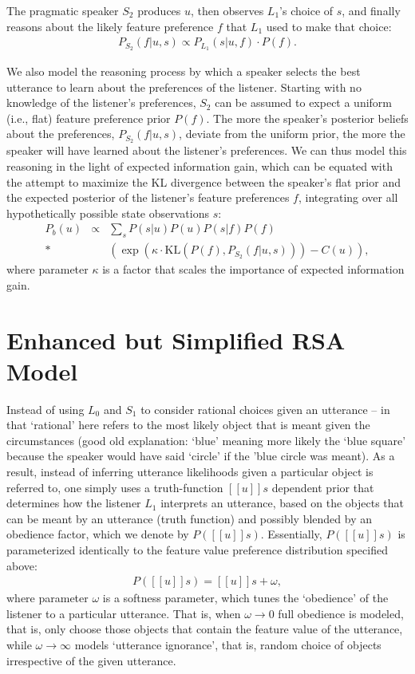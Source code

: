 \documentclass[10pt,a4paper]{article}
\begin{document}
The pragmatic speaker $S_2$ produces $u$, then observes $L_1$'s choice of $s$, and finally reasons about the likely feature preference $f$ that $L_1$ used to make that choice:
\begin{gather}
P_{S_{2}}(f|u,s) \propto P_{L_{1}}(s|u,f) \cdot P(f).
\end{gather}

We also model the reasoning process by which a speaker selects the best utterance to learn about the preferences of the listener.
Starting with no knowledge of the listener's preferences, $S_2$ can be assumed to expect a uniform (i.e., flat) feature preference prior $P(f)$. The more the speaker's posterior beliefs about the preferences, $P_{S_{2}}(f|u,s)$, deviate from the uniform prior, the more the speaker will have learned about the listener's preferences. 
We can thus model this reasoning in the light of expected information gain, which can be equated with the attempt to maximize the KL divergence between the speaker's flat prior and the expected posterior of the listener's feature preferences $f$, integrating over all hypothetically possible state observations $s$:
\begin{eqnarray}
P_{b}(u) &\propto& \sum_{s} P(s|u) P(u) P(s|f) P(f) \\*
&& \left( \exp \left( \kappa \cdot \textrm{KL}(P(f),P_{S_{2}}(f|u,s)) \right) - C(u) \right),
\end{eqnarray}
where parameter $\kappa$ is a factor that scales the importance of expected information gain. 


\section{Enhanced but Simplified RSA Model}
Instead of using $L_0$ and $S_1$ to consider rational choices given an utterance -- in that `rational' here refers to the most likely object that is meant given the circumstances (good old explanation: `blue' meaning more likely the `blue square' because the speaker would have said `circle' if the 'blue circle was meant).
As a result, instead of inferring utterance likelihoods given a particular object is referred to, 
one simply uses a truth-function $[[u]]s$ dependent prior that determines how the listener $L_1$ interprets an utterance, based on the objects that can be meant by an utterance (truth function) and possibly blended by an obedience factor, which we denote by $P([[u]]s)$. 
Essentially, $P([[u]]s)$ is parameterized identically to the feature value preference distribution specified above: 
\begin{gather}
P([[u]]s) = [[u]]s + \omega,
\end{gather}
where parameter $\omega$ is a softness parameter, which tunes the `obedience' of the listener to a particular utterance.
That is,  when $\omega\rightarrow 0$ full obedience is modeled, that is, only choose those objects that contain the feature value of the utterance, while $\omega \rightarrow \infty$ models `utterance ignorance', that is, random choice of objects irrespective of the given utterance.
\end{document}
